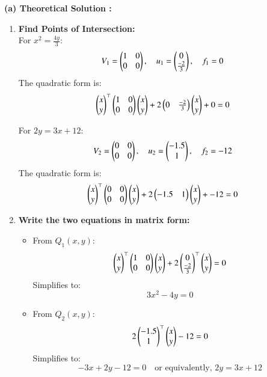 \documentclass[journal]{IEEEtran}
\begin{document}
\textbf{(a) Theoretical Solution : }
\begin{enumerate}
\item \textbf{Find Points of Intersection:} \\  
    For \( x^2 = \frac{4y}{3} \):
    \[
    V_1 = \begin{pmatrix} 
    1 & 0 \\ 
    0 & 0 
    \end{pmatrix}, \quad 
    u_1 = \begin{pmatrix} 
    0 \\ 
    \frac{-2}{3} 
    \end{pmatrix}, \quad 
    f_1 = 0
    \]
    The quadratic form is:
    \[
    \begin{pmatrix} 
    x \\ 
    y 
    \end{pmatrix}^\top 
    \begin{pmatrix} 
    1 & 0 \\ 
    0 & 0 
    \end{pmatrix}
    \begin{pmatrix} 
    x \\ 
    y 
    \end{pmatrix}
    + 2 \begin{pmatrix} 
    0 & \frac{-2}{3} 
    \end{pmatrix}
    \begin{pmatrix} 
    x \\ 
    y 
    \end{pmatrix}
    + 0 = 0
    \]

    For \( 2y = 3x + 12 \):
    \[
    V_2 = \begin{pmatrix} 
    0 & 0 \\ 
    0 & 0 
    \end{pmatrix}, \quad 
    u_2 = \begin{pmatrix} 
    -1.5 \\ 
    1 
    \end{pmatrix}, \quad 
    f_2 = -12
    \]
    The quadratic form is:
    \[
    \begin{pmatrix} 
    x \\ 
    y 
    \end{pmatrix}^\top 
    \begin{pmatrix} 
    0 & 0 \\ 
    0 & 0 
    \end{pmatrix}
    \begin{pmatrix} 
    x \\ 
    y 
    \end{pmatrix}
    + 2 \begin{pmatrix} 
    -1.5 & 1 
    \end{pmatrix}
    \begin{pmatrix} 
    x \\ 
    y 
    \end{pmatrix}
    + -12 = 0
    \]

    \item \textbf{Write the two equations in matrix form:}
    \begin{itemize}
        \item From \( Q_1(x, y) \):
        \[
        \begin{pmatrix} 
        x \\ 
        y 
        \end{pmatrix}^\top 
        \begin{pmatrix} 
        1 & 0 \\ 
        0 & 0 
        \end{pmatrix}
        \begin{pmatrix} 
        x \\ 
        y 
        \end{pmatrix}
        + 2 \begin{pmatrix} 
        0 \\ 
        \frac{-2}{3} 
        \end{pmatrix}^\top 
        \begin{pmatrix} 
        x \\ 
        y 
        \end{pmatrix}
        = 0
        \]
        Simplifies to:
        \[
        3x^2-4y=0
        \]

        \item From \( Q_2(x, y) \):
        \[
        2 \begin{pmatrix} 
        -1.5 \\ 
        1 
        \end{pmatrix}^\top 
        \begin{pmatrix} 
        x \\ 
        y 
        \end{pmatrix} -12
        = 0
        \]
        Simplifies to:
        \[
        -3x + 2y - 12 = 0 \quad \text{or equivalently, } 2y = 3x +12
        \]
    \end{itemize}


\end{enumerate}
\end{document}

